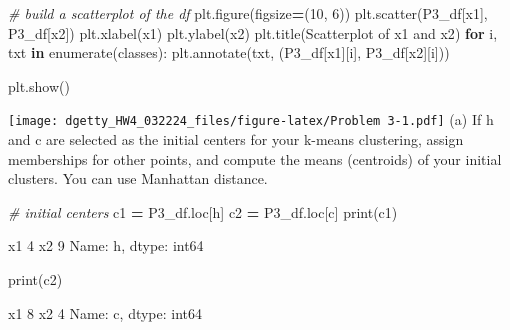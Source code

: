 \documentclass[
]{article}
\newenvironment{Shaded}{\begin{snugshade}}{\end{snugshade}}
\newcommand{\BuiltInTok}[1]{#1}
\newcommand{\CommentTok}[1]{\textcolor[rgb]{0.56,0.35,0.01}{\textit{#1}}}
\newcommand{\ControlFlowTok}[1]{\textcolor[rgb]{0.13,0.29,0.53}{\textbf{#1}}}
\newcommand{\DecValTok}[1]{\textcolor[rgb]{0.00,0.00,0.81}{#1}}
\newcommand{\KeywordTok}[1]{\textcolor[rgb]{0.13,0.29,0.53}{\textbf{#1}}}
\newcommand{\NormalTok}[1]{#1}
\newcommand{\OperatorTok}[1]{\textcolor[rgb]{0.81,0.36,0.00}{\textbf{#1}}}
\newcommand{\StringTok}[1]{\textcolor[rgb]{0.31,0.60,0.02}{#1}}
\begin{document}
\begin{Shaded}
\begin{Highlighting}[]
\CommentTok{\# build a scatterplot of the df}
\NormalTok{plt.figure(figsize}\OperatorTok{=}\NormalTok{(}\DecValTok{10}\NormalTok{, }\DecValTok{6}\NormalTok{))}
\NormalTok{plt.scatter(P3\_df[}\StringTok{\textquotesingle{}x1\textquotesingle{}}\NormalTok{], P3\_df[}\StringTok{\textquotesingle{}x2\textquotesingle{}}\NormalTok{])}
\NormalTok{plt.xlabel(}\StringTok{\textquotesingle{}x1\textquotesingle{}}\NormalTok{)}
\NormalTok{plt.ylabel(}\StringTok{\textquotesingle{}x2\textquotesingle{}}\NormalTok{)}
\NormalTok{plt.title(}\StringTok{\textquotesingle{}Scatterplot of x1 and x2\textquotesingle{}}\NormalTok{)}
\ControlFlowTok{for}\NormalTok{ i, txt }\KeywordTok{in} \BuiltInTok{enumerate}\NormalTok{(classes):}
\NormalTok{    plt.annotate(txt, (P3\_df[}\StringTok{\textquotesingle{}x1\textquotesingle{}}\NormalTok{][i], P3\_df[}\StringTok{\textquotesingle{}x2\textquotesingle{}}\NormalTok{][i]))}

\NormalTok{plt.show()}
\end{Highlighting}
\end{Shaded}

\texttt{[image: dgetty\_HW4\_032224\_files/figure-latex/Problem 3-1.pdf]}
(a) If h and c are selected as the initial centers for your k-means
clustering, assign memberships for other points, and compute the means
(centroids) of your initial clusters. You can use Manhattan distance.

\begin{Shaded}
\begin{Highlighting}[]
\CommentTok{\# initial centers}
\NormalTok{c1 }\OperatorTok{=}\NormalTok{ P3\_df.loc[}\StringTok{\textquotesingle{}h\textquotesingle{}}\NormalTok{]}
\NormalTok{c2 }\OperatorTok{=}\NormalTok{ P3\_df.loc[}\StringTok{\textquotesingle{}c\textquotesingle{}}\NormalTok{]}
\BuiltInTok{print}\NormalTok{(c1)}
\end{Highlighting}
\end{Shaded}

x1 4 x2 9 Name: h, dtype: int64

\begin{Shaded}
\begin{Highlighting}[]
\BuiltInTok{print}\NormalTok{(c2)}
\end{Highlighting}
\end{Shaded}

x1 8 x2 4 Name: c, dtype: int64
\end{document}
